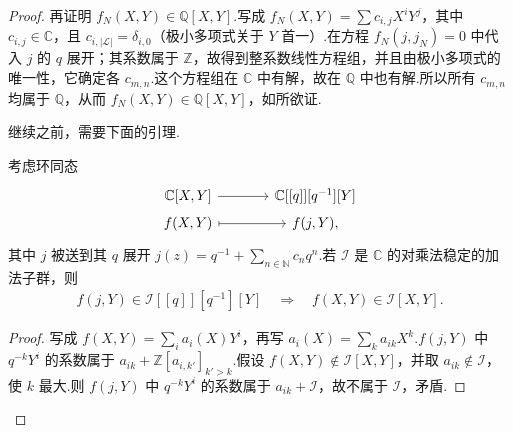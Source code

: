 \begin{proof}
再证明 $f_N(X,Y)\in\mathbb Q[X,Y]$.写成 $f_N(X,Y)=\sum c_{i,j}X^iY^j$，其中 $c_{i,j}\in\mathbb C$，且 $c_{i,|\mathcal L|}=\delta_{i,0}$（极小多项式关于 $Y$ 首一）.在方程 $f_N(j,j_N)=0$ 中代入 $j$ 的 $q$ 展开；其系数属于 $\mathbb Z$，故得到整系数线性方程组，并且由极小多项式的唯一性，它确定各 $c_{m,n}$.这个方程组在 $\mathbb C$ 中有解，故在 $\mathbb Q$ 中也有解.所以所有 $c_{m,n}$ 均属于 $\mathbb Q$，从而 $f_N(X,Y)\in\mathbb Q[X,Y]$，如所欲证.



继续之前，需要下面的引理.

\begin{lemma*}

考虑环同态
\begin{equation*}
\begin{tikzcd}[column sep=large,row sep=0.2em]
\mathbb C[X,Y] \arrow[r] & \mathbb C[[q]][q^{-1}][Y]\\
f(X,Y) \arrow[r,mapsto] & f(j,Y),
\end{tikzcd}
\end{equation*}
其中 $j$ 被送到其 $q$ 展开 $j(z)=q^{-1}+\sum_{n\in\mathbb N}c_nq^n$.若 $\mathcal I$ 是 $\mathbb C$ 的对乘法稳定的加法子群，则
\begin{align*}
f(j,Y)\in\mathcal I[[q]][q^{-1}][Y]\quad\Longrightarrow\quad f(X,Y)\in\mathcal I[X,Y].
\end{align*}
\end{lemma*}

\begin{proof}

写成 $f(X,Y)=\sum_i a_i(X)Y^i$，再写 $a_i(X)=\sum_k a_{ik}X^k$.$f(j,Y)$ 中 $q^{-k}Y^i$ 的系数属于 $a_{ik}+\mathbb Z[a_{i,k'}]_{k'>k}$.假设 $f(X,Y)\notin\mathcal I[X,Y]$，并取 $a_{ik}\notin\mathcal I$，使 $k$ 最大.则 $f(j,Y)$ 中 $q^{-k}Y^i$ 的系数属于 $a_{ik}+\mathcal I$，故不属于 $\mathcal I$，矛盾.

\end{proof}


\end{proof}
